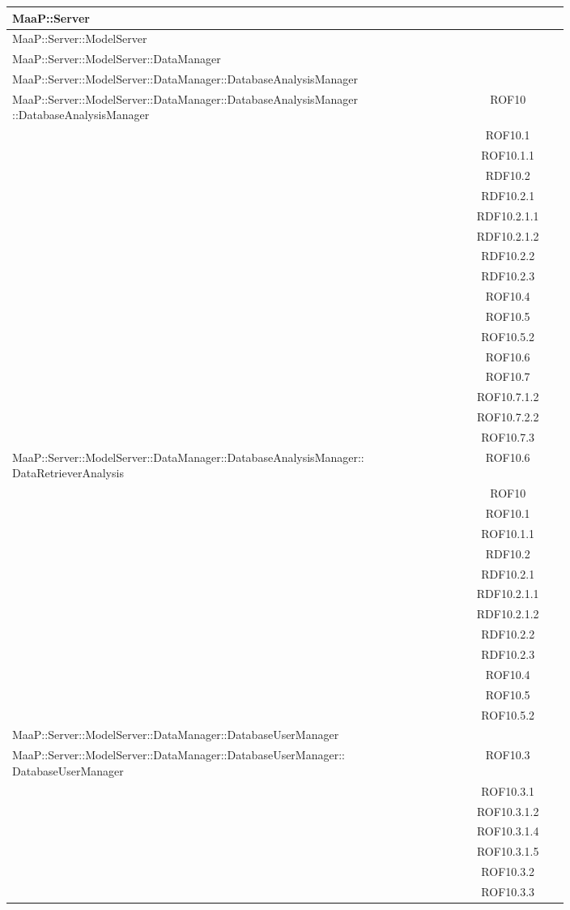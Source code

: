 \begin{center}
\begin{longtable}{|p{0.8\linewidth}|c|}
\midrule 
MaaP::Server
& \\

\midrule 
MaaP::Server::ModelServer
& \\

\midrule 
MaaP::Server::ModelServer::DataManager 
& \\

\midrule
MaaP::Server::ModelServer::DataManager::DatabaseAnalysisManager 
& \\

\midrule 
MaaP::Server::ModelServer::DataManager::DatabaseAnalysisManager ::DatabaseAnalysisManager
& ROF10\\
& ROF10.1\\
& ROF10.1.1\\ 
& RDF10.2\\
& RDF10.2.1\\
& RDF10.2.1.1\\
& RDF10.2.1.2\\
& RDF10.2.2\\
& RDF10.2.3\\
& ROF10.4\\
& ROF10.5\\
& ROF10.5.2\\
& ROF10.6\\
& ROF10.7\\
& ROF10.7.1.2\\
& ROF10.7.2.2\\
& ROF10.7.3\\

\midrule
MaaP::Server::ModelServer::DataManager::DatabaseAnalysisManager:: DataRetrieverAnalysis
& ROF10.6\\ 
& ROF10\\
& ROF10.1\\
& ROF10.1.1\\
& RDF10.2\\
& RDF10.2.1\\
& RDF10.2.1.1\\
& RDF10.2.1.2\\
& RDF10.2.2\\
& RDF10.2.3\\
& ROF10.4\\
& ROF10.5\\
& ROF10.5.2\\

\midrule 
MaaP::Server::ModelServer::DataManager::DatabaseUserManager 
& \\

\midrule 
MaaP::Server::ModelServer::DataManager::DatabaseUserManager:: DatabaseUserManager
& ROF10.3\\
& ROF10.3.1\\
& ROF10.3.1.2\\
& ROF10.3.1.4\\
& ROF10.3.1.5\\
& ROF10.3.2\\
& ROF10.3.3\\



\end{longtable}
\end{center}
